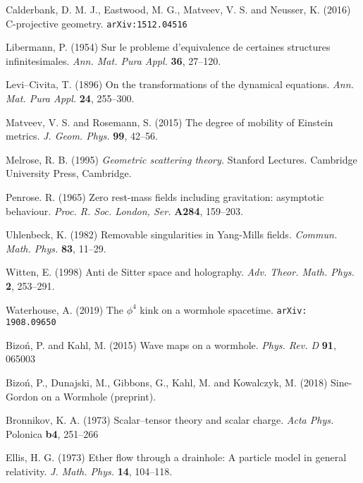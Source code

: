 \begin{thebibliography}{}
 Calderbank,  D. M. J.,  Eastwood, M. G.,  Matveev, V. S. and 
Neusser, K.  (2016) C-projective geometry. {\tt arXiv:1512.04516}



Libermann, P. (1954) Sur le probleme d'equivalence de certaines structures infinitesimales. \textit{Ann.
Mat. Pura Appl.} {\bf 36}, 27--120.


 Levi--Civita, T. (1896) On the transformations of the 
dynamical equations. \textit{Ann. Mat. Pura Appl.} {\bf 24}, 255--300.

 Matveev, V. S. and Rosemann, S. (2015)
The degree of mobility of Einstein metrics. \textit{J. Geom. Phys.}
{\bf 99}, 42--56.


Melrose, R. B. (1995)
{\em Geometric scattering theory.} Stanford Lectures. Cambridge University Press,
Cambridge.

Penrose. R. (1965) Zero rest-mass fields including gravitation: asymptotic behaviour. \textit{Proc. R. 
Soc. London, Ser.} {\bf A284}, 159--203.

 Uhlenbeck, K. (1982) Removable singularities in Yang-Mills fields.
\textit{Commun. Math. Phys.} {\bf 83}, 11--29.

 Witten, E. (1998)
Anti de Sitter space and holography. \textit{Adv. Theor. Math. Phys.} {\bf 2}, 253--291.


 Waterhouse, A. (2019)
The $\phi^4$ kink on a wormhole spacetime. {\tt arXiv: 1908.09650}

 Bizo\'n, P. and Kahl, M. (2015)
Wave maps on a wormhole. \textit{Phys. Rev. D} {\bf 91}, 065003

 Bizo\'n, P., Dunajski, M., Gibbons, G., Kahl, M. and Kowalczyk, M. (2018) Sine-Gordon on a Wormhole (preprint).

 Bronnikov, K. A. (1973)
Scalar--tensor theory and scalar charge. \textit{Acta Phys.} Polonica {\bf b4}, 251--266

 Ellis, H. G. (1973)
Ether flow through a drainhole: A particle model in general relativity. \textit{J. Math. Phys.} {\bf 14}, 104--118.


\end{thebibliography}
